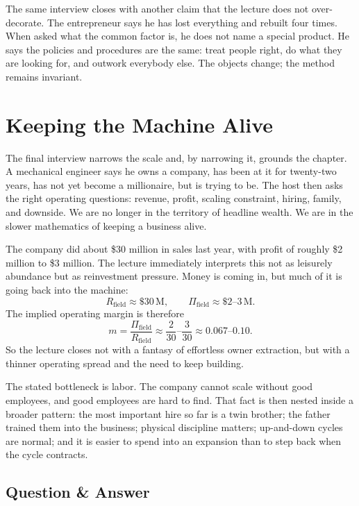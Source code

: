 The same interview closes with another claim that the lecture does not over-decorate. The entrepreneur says he has lost everything and rebuilt four times. When asked what the common factor is, he does not name a special product. He says the policies and procedures are the same: treat people right, do what they are looking for, and outwork everybody else. The objects change; the method remains invariant.

\section{Keeping the Machine Alive}

The final interview narrows the scale and, by narrowing it, grounds the chapter. A mechanical engineer says he owns a company, has been at it for twenty-two years, has not yet become a millionaire, but is trying to be. The host then asks the right operating questions: revenue, profit, scaling constraint, hiring, family, and downside. We are no longer in the territory of headline wealth. We are in the slower mathematics of keeping a business alive.

The company did about \$30 million in sales last year, with profit of roughly \$2 million to \$3 million. The lecture immediately interprets this not as leisurely abundance but as reinvestment pressure. Money is coming in, but much of it is going back into the machine:
\begin{equation}
R_{\mathrm{field}} \approx \$30\,\mathrm{M},
\qquad
\Pi_{\mathrm{field}} \approx \$2\text{--}3\,\mathrm{M}.
\end{equation}
The implied operating margin is therefore
\begin{equation}
m = \frac{\Pi_{\mathrm{field}}}{R_{\mathrm{field}}}
\approx \frac{2}{30}\text{--}\frac{3}{30}
\approx 0.067\text{--}0.10.
\end{equation}
So the lecture closes not with a fantasy of effortless owner extraction, but with a thinner operating spread and the need to keep building.

The stated bottleneck is labor. The company cannot scale without good employees, and good employees are hard to find. That fact is then nested inside a broader pattern: the most important hire so far is a twin brother; the father trained them into the business; physical discipline matters; up-and-down cycles are normal; and it is easier to spend into an expansion than to step back when the cycle contracts.

\subsection{Question \& Answer}


